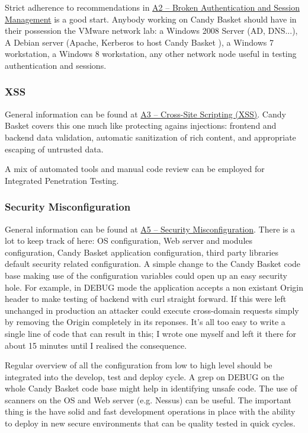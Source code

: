 \documentclass[letterpaper,10pt,english]{sphinxmanual}
\begin{document}
Strict adherence to recommendations in \href{https://owasp.org/index.php/Top\_10\_2013-A2-Broken\_Authentication\_and\_Session\_Management}{A2 -- Broken Authentication
and Session Management}
is a good start. Anybody working on Candy Basket should have in their
possession the VMware network lab: a Windows 2008 Server (AD, DNS...),
A Debian server (Apache, Kerberos to host Candy Basket ), a Windows 7
workstation, a Windows 8 workstation, any other network node useful in
testing authentication and sessions.


\subsubsection{XSS}
\label{developer-guide:xss}
General information can be found at \href{https://owasp.org/index.php/Top\_10\_2013-A3-Cross-Site\_Scripting\_(XSS)}{A3 -- Cross-Site Scripting (XSS)}. Candy
Basket covers this one much like protecting agains injections:
frontend and backend data validation, automatic sanitization of rich
content, and appropriate escaping of untrusted data.

A mix of automated tools and manual code review can be employed for
Integrated Penetration Testing.


\subsubsection{Security Misconfiguration}
\label{developer-guide:security-misconfiguration}
General information can be found at \href{https://owasp.org/index.php/Top\_10\_2013-A5-Security\_Misconfiguration}{A5 -- Security Misconfiguration}. There
is a lot to keep track of here: OS configuration, Web server and
modules configuration, Candy Basket application configuration, third
party libraries default security related configuration. A simple
change to the Candy Basket code base making use of the configuration
variables could open up an easy security hole. For example, in DEBUG
mode the application accepts a non existant Origin header to make
testing of backend with curl straight forward. If this were left
unchanged in production an attacker could execute cross-domain
requests simply by removing the Origin completely in its
reponses. It's all too easy to write a single line of code that can
result in this; I wrote one myself and left it there for about 15
minutes until I realised the consequence.

Regular overview of all the configuration from low to high level
should be integrated into the develop, test and deploy cycle. A grep
on DEBUG on the whole Candy Basket code base might help in identifying
unsafe code. The use of scanners on the OS and Web server
(e.g. Nessus) can be useful. The important thing is the have solid and
fast development operations in place with the ability to deploy in new
secure environments that can be quality tested in quick cycles.
\end{document}
